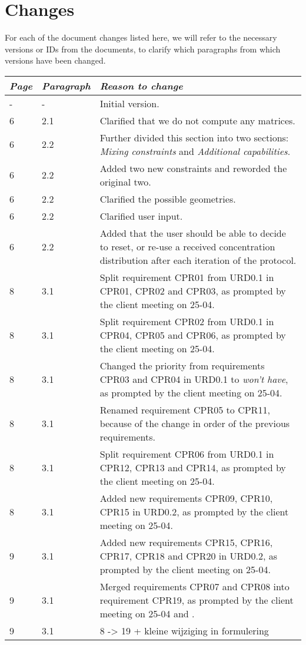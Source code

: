 \section*{Changes}
For each of the document changes listed here, we will refer to the necessary versions or IDs from the documents, to clarify which paragraphs from which versions have been changed. \\

\begin{tabular}[!]{|l|l|p{8cm}|}
    \hline
    \emph{Page} &   \emph{Paragraph}    &   \emph{Reason to change}\\
    \hline
     - & -  & Initial version. \\
     6 & 2.1 & Clarified that we do not compute any matrices. \\
     6 & 2.2 & Further divided this section into two sections: \emph{Mixing constraints} and \emph{Additional capabilities}. \\
     6 & 2.2 & Added two new constraints and reworded the original two. \\     
     6 & 2.2 & Clarified the possible geometries. \\
     6 & 2.2 & Clarified user input. \\
     6 & 2.2 & Added that the user should be able to decide to reset, or re-use a received concentration distribution after each iteration of the protocol. \\
    8 & 3.1 & Split requirement CPR01 from URD0.1 in CPR01, CPR02 and CPR03, as prompted by the client meeting on 25-04. \\
    8 & 3.1 & Split requirement CPR02 from URD0.1 in CPR04, CPR05 and CPR06, as prompted by the client meeting on 25-04. \\
    8 & 3.1 & Changed the priority from requirements CPR03 and CPR04 in URD0.1 to \emph{won't have}, as prompted by the client meeting on 25-04. \\
    8 & 3.1 & Renamed requirement CPR05 to CPR11, because of the change in order of the previous requirements. \\
    8 & 3.1 & Split requirement CPR06 from URD0.1 in CPR12, CPR13 and CPR14, as prompted by the client meeting on 25-04. \\
    8 & 3.1 & Added new requirements CPR09, CPR10, CPR15 in URD0.2, as prompted by the client meeting on 25-04.  \\
    9 & 3.1 & Added new requirements CPR15, CPR16, CPR17, CPR18 and CPR20 in URD0.2, as prompted by the client meeting on 25-04.\\
    9 & 3.1 & Merged requirements CPR07 and CPR08 into requirement CPR19, as prompted by the client meeting on 25-04 and . \\


    9 & 3.1 & 8 -> 19 + kleine wijziging in formulering \\
    \hline
\end{tabular}
